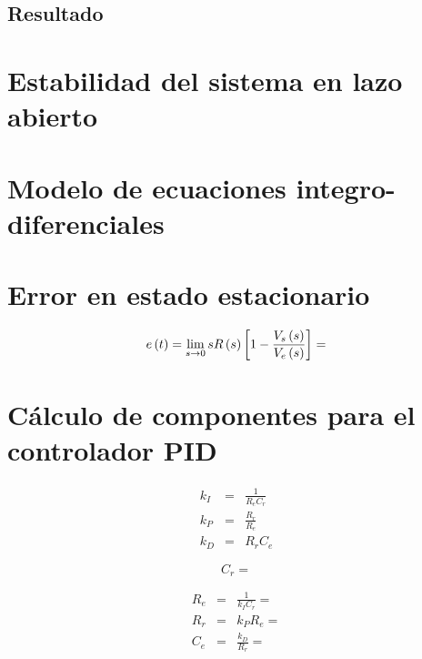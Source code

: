 \documentclass[letterpaper,11pt]{article}
\begin{document}
\subsection{Resultado}

\section{Estabilidad del sistema en lazo abierto}

\section{Modelo de ecuaciones integro-diferenciales}

\section{Error en estado estacionario}

\begin{equation*}
e\left( t\right) =\lim_{s\rightarrow 0}sR\left( s\right) \left[ 1-\dfrac{%
V_{s}\left( s\right) }{V_{e}\left( s\right) }\right] =
\end{equation*}

\section{C\'{a}lculo de componentes para el controlador PID}

\begin{eqnarray*}
k_{I} &=&\frac{1}{R_{e}C_{r}} \\
k_{P} &=&\frac{R_{r}}{R_{e}} \\
k_{D} &=&R_{r}C_{e}
\end{eqnarray*}

\begin{equation*}
C_{r}=
\end{equation*}

\begin{eqnarray*}
R_{e} &=&\frac{1}{k_{I}C_{r}}= \\
R_{r} &=&k_{P}R_{e}= \\
C_{e} &=&\frac{k_{D}}{R_{r}}=
\end{eqnarray*}
\end{document}
